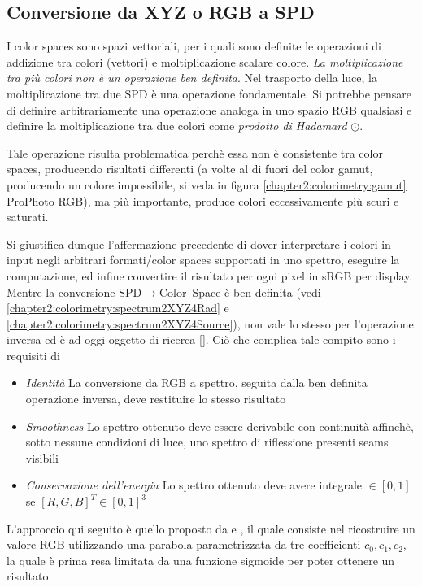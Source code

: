 \subsection{Conversione da XYZ o RGB a SPD}
I color spaces sono spazi vettoriali, per i quali sono definite le operazioni di addizione tra colori (vettori) e moltiplicazione scalare colore.
\textit{La moltiplicazione tra pi\`u colori non \`e un operazione ben definita}. Nel trasporto della luce, la moltiplicazione tra due SPD \`e una 
operazione fondamentale. Si potrebbe pensare di definire arbitrariamente una operazione analoga in uno spazio RGB qualsiasi e definire la 
moltiplicazione tra due colori come \textit{prodotto di Hadamard} $\odot$.\par
Tale operazione risulta problematica perch\`e essa non \`e consistente tra color spaces, producendo risultati differenti (a volte al di fuori del 
color gamut, producendo un colore impossibile, si veda in figura \ref{chapter2:colorimetry:gamut} ProPhoto RGB), ma pi\`u importante, produce colori
eccessivamente pi\`u scuri e saturati.\par
Si giustifica dunque l'affermazione precedente di dover interpretare i colori in input negli arbitrari formati/color spaces supportati in uno spettro,
eseguire la computazione, ed infine convertire il risultato per ogni pixel in sRGB per display. Mentre la conversione 
\mbox{SPD$\rightarrow$Color Space} \`e ben definita (vedi \ref{chapter2:colorimetry:spectrum2XYZ4Rad} e 
\ref{chapter2:colorimetry:spectrum2XYZ4Source}), non vale lo stesso per l'operazione inversa ed \`e ad oggi oggetto di ricerca [\cite{spectrum}].
Ci\`o che complica tale compito sono i requisiti di 
\begin{itemize}[topsep=0pt, noitemsep]
	\item[] \textit{Identit\`a} La conversione da RGB a spettro, seguita dalla ben definita operazione inversa, deve restituire lo stesso risultato
	\item[] \textit{Smoothness} Lo spettro ottenuto deve essere derivabile con continuit\`a affinch\`e, sotto nessune condizioni di luce, uno spettro
		di riflessione presenti seams visibili
	\item[] \textit{Conservazione dell'energia} Lo spettro ottenuto deve avere integrale $\in [0,1]$ se $[R, G, B]^T \in [0,1]^3$
\end{itemize}
L'approccio qui seguito \`e quello proposto da \cite{pharr} e \cite{rgb2spec}, il quale consiste nel ricostruire un valore RGB utilizzando una
parabola parametrizzata da tre coefficienti $c_0,c_1,c_2$, la quale \`e prima resa limitata da una funzione sigmoide per poter ottenere un risultato

